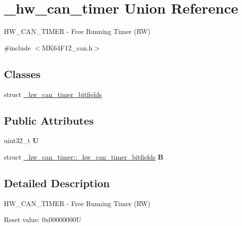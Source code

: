 \hypertarget{union__hw__can__timer}{}\section{\+\_\+hw\+\_\+can\+\_\+timer Union Reference}
\label{union__hw__can__timer}


H\+W\+\_\+\+C\+A\+N\+\_\+\+T\+I\+M\+ER -\/ Free Running Timer (RW)  




{\ttfamily \#include $<$M\+K64\+F12\+\_\+can.\+h$>$}

\subsection*{Classes}
\begin{DoxyCompactItemize}
\item 
struct \hyperlink{struct__hw__can__timer_1_1__hw__can__timer__bitfields}{\+\_\+hw\+\_\+can\+\_\+timer\+\_\+bitfields}
\end{DoxyCompactItemize}
\subsection*{Public Attributes}
\begin{DoxyCompactItemize}
\item 
uint32\+\_\+t {\bfseries U}\hypertarget{union__hw__can__timer_a60fd94790179132e179f1d87a07ce2a8}{}\label{union__hw__can__timer_a60fd94790179132e179f1d87a07ce2a8}

\item 
struct \hyperlink{struct__hw__can__timer_1_1__hw__can__timer__bitfields}{\+\_\+hw\+\_\+can\+\_\+timer\+::\+\_\+hw\+\_\+can\+\_\+timer\+\_\+bitfields} {\bfseries B}\hypertarget{union__hw__can__timer_a1b26d8f1e457d10b537ef15b4e05a746}{}\label{union__hw__can__timer_a1b26d8f1e457d10b537ef15b4e05a746}

\end{DoxyCompactItemize}


\subsection{Detailed Description}
H\+W\+\_\+\+C\+A\+N\+\_\+\+T\+I\+M\+ER -\/ Free Running Timer (RW) 

Reset value\+: 0x00000000U


